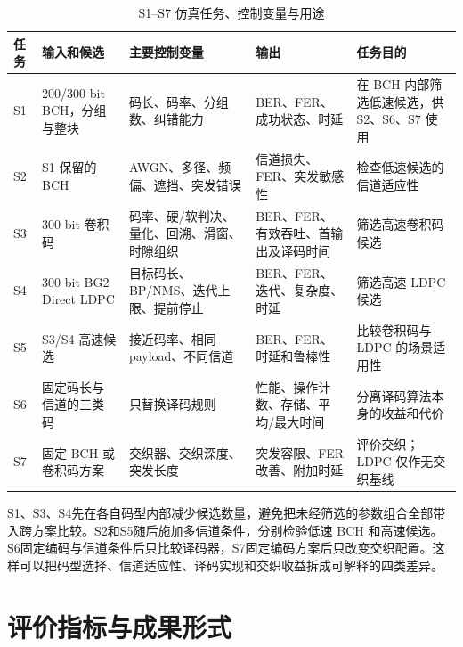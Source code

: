 \begin{table}[htbp]
  \centering
  \scriptsize
  \caption{S1--S7 仿真任务、控制变量与用途}
  \label{tab:s1-s7-purpose}
  \begin{tabular}{p{}p{}p{}p{}p{}}
    \toprule
    任务 & 输入和候选 & 主要控制变量 & 输出 & 任务目的 \\
    \midrule
    S1 & 200/300 bit BCH，分组与整块 & 码长、码率、分组数、纠错能力 & BER、FER、成功状态、时延 & 在 BCH 内部筛选低速候选，供 S2、S6、S7 使用 \\
    S2 & S1 保留的 BCH & AWGN、多径、频偏、遮挡、突发错误 & 信道损失、FER、突发敏感性 & 检查低速候选的信道适应性 \\
    S3 & 300 bit 卷积码 & 码率、硬/软判决、量化、回溯、滑窗、时隙组织 & BER、FER、有效吞吐、首输出及译码时间 & 筛选高速卷积码候选 \\
    S4 & 300 bit BG2 Direct LDPC & 目标码长、BP/NMS、迭代上限、提前停止 & BER、FER、迭代、复杂度、时延 & 筛选高速 LDPC 候选 \\
    S5 & S3/S4 高速候选 & 接近码率、相同 payload、不同信道 & BER、FER、时延和鲁棒性 & 比较卷积码与 LDPC 的场景适用性 \\
    S6 & 固定码长与信道的三类码 & 只替换译码规则 & 性能、操作计数、存储、平均/最大时间 & 分离译码算法本身的收益和代价 \\
    S7 & 固定 BCH 或卷积码方案 & 交织器、交织深度、突发长度 & 突发容限、FER 改善、附加时延 & 评价交织；LDPC 仅作无交织基线 \\
    \bottomrule
  \end{tabular}
\end{table}

S1、S3、S4先在各自码型内部减少候选数量，避免把未经筛选的参数组合全部带入跨方案比较。S2和S5随后施加多信道条件，分别检验低速 BCH 和高速候选。S6固定编码与信道条件后只比较译码器，S7固定编码方案后只改变交织配置。这样可以把码型选择、信道适应性、译码实现和交织收益拆成可解释的四类差异。

\section{评价指标与成果形式}

